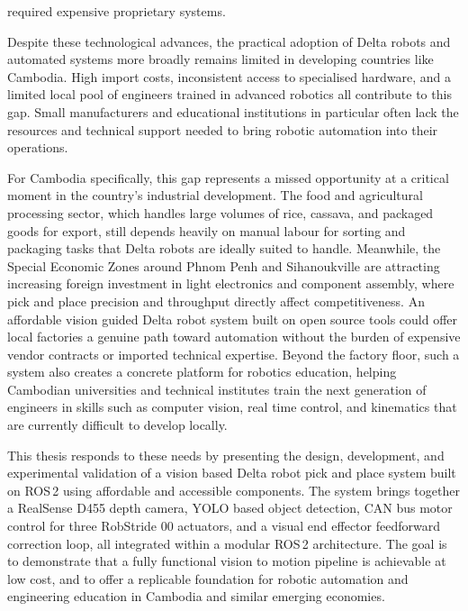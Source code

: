 required expensive proprietary systems.
\par
\hspace{1.27cm}
Despite these technological advances, the practical adoption of Delta robots and automated
systems more broadly remains limited in developing countries like Cambodia. High import
costs, inconsistent access to specialised hardware, and a limited local pool of engineers
trained in advanced robotics all contribute to this gap. Small manufacturers and
educational institutions in particular often lack the resources and technical support needed
to bring robotic automation into their operations.
\par
\hspace{1.27cm}
For Cambodia specifically, this gap represents a missed opportunity at a critical moment
in the country's industrial development. The food and agricultural processing sector,
which handles large volumes of rice, cassava, and packaged goods for export, still depends
heavily on manual labour for sorting and packaging tasks that Delta robots are ideally
suited to handle. Meanwhile, the Special Economic Zones around Phnom Penh and Sihanoukville
are attracting increasing foreign investment in light electronics and component assembly,
where pick and place precision and throughput directly affect competitiveness. An affordable
vision guided Delta robot system built on open source tools could offer local factories a
genuine path toward automation without the burden of expensive vendor contracts or imported
technical expertise. Beyond the factory floor, such a system also creates a concrete
platform for robotics education, helping Cambodian universities and technical institutes
train the next generation of engineers in skills such as computer vision, real time control,
and kinematics that are currently difficult to develop locally.
\par
\hspace{1.27cm}
This thesis responds to these needs by presenting the design, development, and experimental
validation of a vision based Delta robot pick and place system built on ROS\,2 using
affordable and accessible components. The system brings together a RealSense D455 depth
camera, YOLO based object detection, CAN bus motor control for three RobStride 00
actuators, and a visual end effector feedforward correction loop, all integrated within a
modular ROS\,2 architecture. The goal is to demonstrate that a fully functional vision to
motion pipeline is achievable at low cost, and to offer a replicable foundation for robotic
automation and engineering education in Cambodia and similar emerging economies.
